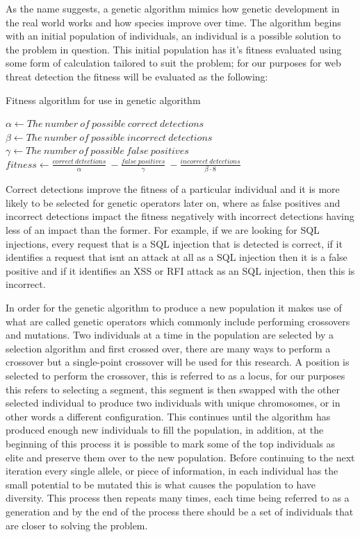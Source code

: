 As the name suggests, a genetic algorithm mimics how genetic development in the real world works and how species improve over time.  The algorithm begins with an initial population of individuals, an individual is a possible solution to the problem in question.  This initial population has it's fitness evaluated using some form of calculation tailored to suit the problem; for our purposes for web threat detection the fitness will be evaluated as the following:

\begin{algorithm}[H]
	\label{alg:fitness}
	\caption{Fitness algorithm for use in genetic algorithm}
	
	$\alpha \leftarrow The\ number\ of\ possible\ correct\ detections$ \\
	$\beta \leftarrow The\ number\ of\ possible\ incorrect\ detections$ \\
	$\gamma \leftarrow The\ number\ of\ possible\ false\ positives$ \\

	$fitness \leftarrow \frac{correct\ detections}{\alpha}\ - \frac{false\ positives}{\gamma}\ - \frac{incorrect\ detections}{\beta \cdot 8}$
\end{algorithm}

Correct detections improve the fitness of a particular individual and it is more likely to be selected for genetic operators later on, where as false positives and incorrect detections impact the fitness negatively with incorrect detections having less of an impact than the former.  For example, if we are looking for SQL injections, every request that is a SQL injection that is detected is correct, if it identifies a request that isnt an attack at all as a SQL injection then it is a false positive and if it identifies an XSS or RFI attack as an SQL injection, then this is incorrect.

In order for the genetic algorithm to produce a new population it makes use of what are called genetic operators which commonly include performing crossovers and mutations.  Two individuals at a time in the population are selected by a selection algorithm and first crossed over, there are many ways to perform a crossover but a single-point crossover will be used for this research.  A position is selected to perform the crossover, this is referred to as a locus, for our purposes this refers to selecting a segment, this segment is then swapped with the other selected individual to produce two individuals with unique chromosomes, or in other words a different configuration.  This continues until the algorithm has produced enough new individuals to fill the population, in addition, at the beginning of this process it is possible to mark some of the top individuals as elite and preserve them over to the new population.  Before continuing to the next iteration every single allele, or piece of information, in each individual has the small potential to be mutated this is what causes the population to have diversity.  This process then repeats many times, each time being referred to as a generation and by the end of the process there should be a set of individuals that are closer to solving the problem.

